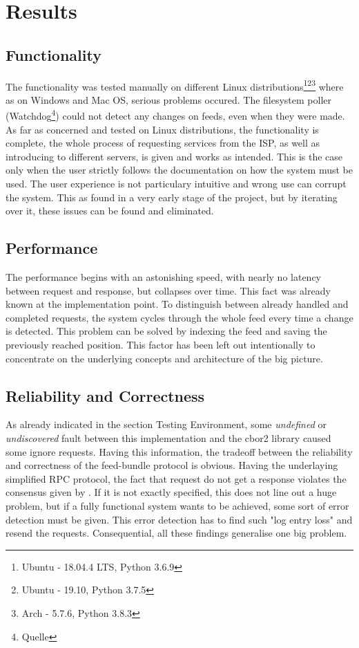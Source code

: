 \section{Results}
\subsection{Functionality}
The functionality was tested manually on different Linux distributions\footnote{Ubuntu - 18.04.4 LTS, Python 3.6.9}\footnote{Ubuntu - 19.10, Python 3.7.5}\footnote{Arch - 5.7.6, Python 3.8.3} where as on Windows and Mac OS, serious problems occured. The filesystem poller (Watchdog\footnote{Quelle}) could not detect any changes on feeds, even when they were made. As far as concerned and tested on Linux distributions, the functionality is complete, the whole process of requesting services from the ISP, as well as introducing to different servers, is given and works as intended. This is the case only when the user strictly follows the documentation on how the system must be used. The user experience is not particulary intuitive and wrong use can corrupt the system. This as found in a very early stage of the project, but by iterating over it, these issues can be found and eliminated.
\subsection{Performance}
The performance begins with an astonishing speed, with nearly no latency between request and response, but collapses over time. This fact was already known at the implementation point. To distinguish between already handled and completed requests, the system cycles through the whole feed every time a change is detected. This problem can be solved by indexing the feed and saving the previously reached position. This factor has been left out intentionally to concentrate on the underlying concepts and architecture of the big 
picture.
\subsection{Reliability and Correctness}
As already indicated in the section Testing Environment, some \textit{undefined} or \textit{undiscovered} fault between this implementation and the cbor2 library caused some ignore requests. Having this information, the tradeoff between the reliability and correctness of the feed-bundle protocol is obvious. Having the underlaying simplified RPC protocol, the fact that request do not get a response violates the consensus given by \citet{birrell1984implementing}. If it is not exactly specified, this does not line out a huge problem, but if a fully functional system wants to be achieved, some sort of error detection must be given. This error detection has to find such "log entry loss" and resend the requests. Consequential, all these findings generalise one big problem.

